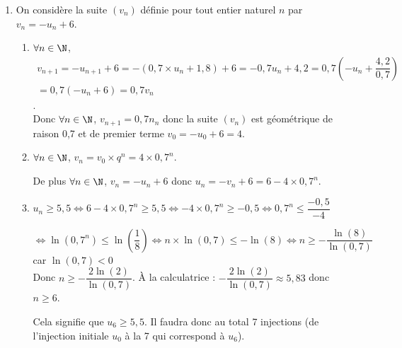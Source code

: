 \begin{enumerate}
\begin{enumerate}
		$l=0,7l+1,8\iff 0,3l=1,8\iff l=6$. Donc $\displaystyle\lim\limits_{n \rightarrow +\infty} u_n=6$
	\end{enumerate}
\item On considère la suite $(v_n)$ définie pour tout entier naturel $n$ par $v_{n}=-u_{n}+6$.
\begin{enumerate}
	\item $\forall n\in \N$, $\begin{gathered}v_{n+1}=-u_{n+1}+6=-(0,7\times u_n+1,8)+6=-0,7u_n+4,2=0,7\left(-u_n+\dfrac{4,2}{0,7}\right)\\=0,7(-u_n+6)=0,7v_n\end{gathered}$.\\
	Donc $\forall n\in \N$, $v_{n+1}=0,7n_n$ donc la suite $\left(v_n\right)$  est géométrique de raison 0,7 et de premier terme $v_0=-u_0+6=4$.
	\item $\forall n\in \N$, $v_n=v_0 \times q^n=4 \times 0,7^n$.
	
De plus  $\forall n\in \N$, $v_n=-u_n+6$ donc $u_n=-v_n+6=6-4\times 0,7^n$.
	 \item $u_n\geqslant 5,5 \iff 6-4\times 0,7^n\geqslant 5,5 \iff -4\times 0,7^n\geqslant -0,5 \iff 0,7^n\leqslant \dfrac{-0,5}{-4}$

$\iff \ln\left(0,7^n\right) \leqslant \ln\left(\dfrac{1}{8}\right) \iff n\times \ln(0,7) \leqslant -\ln(8) \iff n\geqslant -\dfrac{\ln(8)}{\ln(0,7)}$ car $\ln(0,7)<0$\\
Donc $n\geqslant -\dfrac{2\ln(2)}{\ln(0,7)}$. À la calculatrice : $-\dfrac{2\ln(2)}{\ln(0,7)}\approx 5,83$ donc $n\geqslant 6$.

Cela signifie que $u_6\geqslant 5,5$. Il faudra donc au total 7 injections (de l'injection initiale $u_0$ à la 7 qui correspond à $u_6$).
\end{enumerate}
\end{enumerate}

\bigskip
